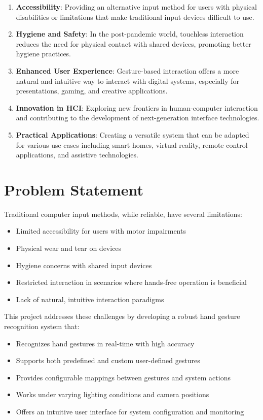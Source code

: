 \documentclass[12pt,a4paper]{report}
\begin{document}
\begin{enumerate}
    \item \textbf{Accessibility}: Providing an alternative input method for users with physical disabilities or limitations that make traditional input devices difficult to use.
    
    \item \textbf{Hygiene and Safety}: In the post-pandemic world, touchless interaction reduces the need for physical contact with shared devices, promoting better hygiene practices.
    
    \item \textbf{Enhanced User Experience}: Gesture-based interaction offers a more natural and intuitive way to interact with digital systems, especially for presentations, gaming, and creative applications.
    
    \item \textbf{Innovation in HCI}: Exploring new frontiers in human-computer interaction and contributing to the development of next-generation interface technologies.
    
    \item \textbf{Practical Applications}: Creating a versatile system that can be adapted for various use cases including smart homes, virtual reality, remote control applications, and assistive technologies.
\end{enumerate}

\section{Problem Statement}

Traditional computer input methods, while reliable, have several limitations:

\begin{itemize}
    \item Limited accessibility for users with motor impairments
    \item Physical wear and tear on devices
    \item Hygiene concerns with shared input devices
    \item Restricted interaction in scenarios where hands-free operation is beneficial
    \item Lack of natural, intuitive interaction paradigms
\end{itemize}

This project addresses these challenges by developing a robust hand gesture recognition system that:
\begin{itemize}
    \item Recognizes hand gestures in real-time with high accuracy
    \item Supports both predefined and custom user-defined gestures
    \item Provides configurable mappings between gestures and system actions
    \item Works under varying lighting conditions and camera positions
    \item Offers an intuitive user interface for system configuration and monitoring
\end{itemize}
\end{document}
